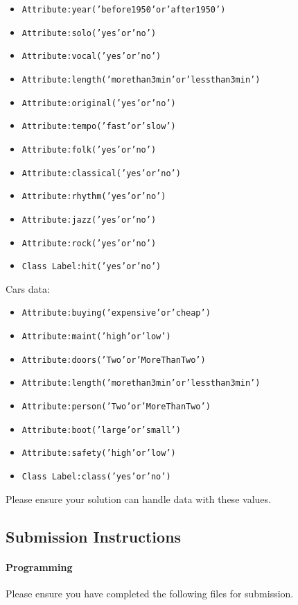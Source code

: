 \documentclass[11pt]{article}
\numberwithin{equation}{section} %
\numberwithin{figure}{section} %
\numberwithin{table}{section} %
\begin{document}
\begin{itemize}
\item \texttt{Attribute:year('before1950'or'after1950')}
\item \texttt{Attribute:solo('yes'or'no')}
\item \texttt{Attribute:vocal('yes'or'no')}
\item \texttt{Attribute:length('morethan3min'or'lessthan3min')}
\item \texttt{Attribute:original('yes'or'no')}
\item \texttt{Attribute:tempo('fast'or'slow')}
\item \texttt{Attribute:folk('yes'or'no')}
\item \texttt{Attribute:classical('yes'or'no')}
\item \texttt{Attribute:rhythm('yes'or'no')}
\item \texttt{Attribute:jazz('yes'or'no')}
\item \texttt{Attribute:rock('yes'or'no')}
\item \texttt{Class Label:hit('yes'or'no')}
\end{itemize}

Cars data:

\begin{itemize}
\item \texttt{Attribute:buying('expensive'or'cheap')}
\item \texttt{Attribute:maint('high'or'low')}
\item \texttt{Attribute:doors('Two'or'MoreThanTwo')}
\item \texttt{Attribute:length('morethan3min'or'lessthan3min')}
\item \texttt{Attribute:person('Two'or'MoreThanTwo')}
\item \texttt{Attribute:boot('large'or'small')}
\item \texttt{Attribute:safety('high'or'low')}
\item \texttt{Class Label:class('yes'or'no')}
\end{itemize}

Please ensure your solution can handle data with these values.

\subsection{Submission Instructions}

\paragraph{Programming}
Please ensure you have completed the following files for submission.
\end{document}
